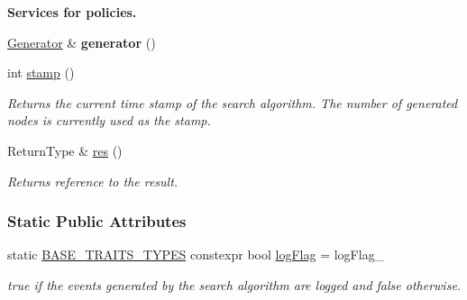 \begin{Indent}{\bf Services for policies.}
\begin{DoxyCompactItemize}
\item 
\hyperlink{structalgorithm_1_1Algorithm_a4b5d0c94b49b586bd31af92ed6ec94ad}{Generator} \& {\bfseries generator} ()\hypertarget{structalgorithm_1_1Algorithm_a5d672b3ffbb4d7ed627d21b8840255cb}{}\label{structalgorithm_1_1Algorithm_a5d672b3ffbb4d7ed627d21b8840255cb}

\item 
int \hyperlink{structalgorithm_1_1Algorithm_a8397b85b3f810d007bfb82a4aafa2dcf}{stamp} ()
\begin{DoxyCompactList}\small\item\em Returns the current time stamp of the search algorithm. The number of generated nodes is currently used as the stamp. \end{DoxyCompactList}\item 
Return\+Type \& \hyperlink{structalgorithm_1_1Algorithm_a247e95d77c29e1984ece6cd33368071c}{res} ()
\begin{DoxyCompactList}\small\item\em Returns reference to the result. \end{DoxyCompactList}\end{DoxyCompactItemize}
\end{Indent}
\subsubsection*{Static Public Attributes}
\begin{DoxyCompactItemize}
\item 
static \hyperlink{algorithm_8h_af9ce42dc0033d5c93cea8af7002ab583}{B\+A\+S\+E\+\_\+\+T\+R\+A\+I\+T\+S\+\_\+\+T\+Y\+P\+ES} constexpr bool \hyperlink{structalgorithm_1_1Algorithm_a496f64e9209c945e4ecd5335ff3ddd75}{log\+Flag} = log\+Flag\+\_\+\hypertarget{structalgorithm_1_1Algorithm_a496f64e9209c945e4ecd5335ff3ddd75}{}\label{structalgorithm_1_1Algorithm_a496f64e9209c945e4ecd5335ff3ddd75}

\begin{DoxyCompactList}\small\item\em {\ttfamily true} if the events generated by the search algorithm are logged and {\ttfamily false} otherwise. \end{DoxyCompactList}\end{DoxyCompactItemize}
